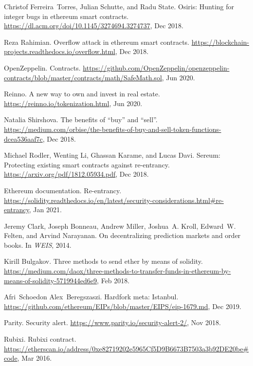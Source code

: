 \begin{thebibliography}{10}
Christof Ferreira~Torres, Julian Schutte, and Radu State.
\newblock Osiris: Hunting for integer bugs in ethereum smart contracts.
\newblock \url{https://dl.acm.org/doi/10.1145/3274694.3274737}, Dec 2018.

Reza Rahimian.
\newblock Overflow attack in ethereum smart contracts.
\newblock \url{https://blockchain-projects.readthedocs.io/overflow.html}, Dec
  2018.

OpenZeppelin.
\newblock Contracts.
\newblock
  \url{https://github.com/OpenZeppelin/openzeppelin-contracts/blob/master/contracts/math/SafeMath.sol},
  Jun 2020.

Reinno.
\newblock A new way to own and invest in real estate.
\newblock \url{https://reinno.io/tokenization.html}, Jun 2020.

Natalia Shirshova.
\newblock The benefits of ``buy'' and ``sell''.
\newblock
  \url{https://medium.com/orbise/the-benefits-of-buy-and-sell-token-functions-dcea536aaf7c},
  Dec 2018.

Michael Rodler, Wenting Li, Ghassan Karame, and Lucas Davi.
\newblock Sereum: Protecting existing smart contracts against re-entrancy.
\newblock \url{https://arxiv.org/pdf/1812.05934.pdf}, Dec 2018.

Ethereum documentation.
\newblock Re-entrancy.
\newblock
  \url{https://solidity.readthedocs.io/en/latest/security-considerations.html\#re-entrancy},
  Jan 2021.

Jeremy Clark, Joseph Bonneau, Andrew Miller, Joshua~A. Kroll, Edward~W. Felten,
  and Arvind Narayanan.
\newblock On decentralizing prediction markets and order books.
\newblock In {\em WEIS}, 2014.

Kirill Bulgakov.
\newblock Three methods to send ether by means of solidity.
\newblock
  \url{https://medium.com/daox/three-methods-to-transfer-funds-in-ethereum-by-means-of-solidity-5719944ed6e9},
  Feb 2018.

Afri~Schoedon Alex~Beregszaszi.
\newblock Hardfork meta: Istanbul.
\newblock \url{https://github.com/ethereum/EIPs/blob/master/EIPS/eip-1679.md},
  Dec 2019.

Parity.
\newblock Security alert.
\newblock \url{https://www.parity.io/security-alert-2/}, Nov 2018.

Rubixi.
\newblock Rubixi contract.
\newblock
  \url{https://etherscan.io/address/0xe82719202e5965Cf5D9B6673B7503a3b92DE20be#code},
  Mar 2016.


\end{thebibliography}
